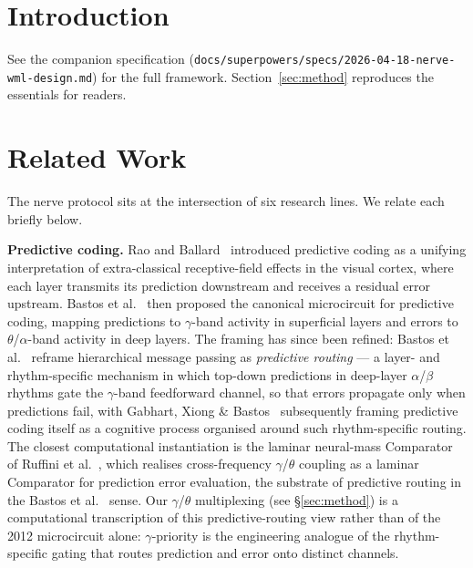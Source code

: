 \documentclass[10pt,twocolumn]{article}
\begin{document}
\section{Introduction}
See the companion specification (\texttt{docs/superpowers/specs/2026-04-18-nerve-wml-design.md})
for the full framework. Section~\ref{sec:method} reproduces the
essentials for readers.

\section{Related Work}

The nerve protocol sits at the intersection of six research lines. We relate each briefly below.

\textbf{Predictive coding.} Rao and Ballard~\cite{rao1999predictive} introduced predictive coding as a unifying interpretation of extra-classical receptive-field effects in the visual cortex, where each layer transmits its prediction downstream and receives a residual error upstream. Bastos et al.~\cite{bastos2012canonical} then proposed the canonical microcircuit for predictive coding, mapping predictions to $\gamma$-band activity in superficial layers and errors to $\theta$/$\alpha$-band activity in deep layers. The framing has since been refined: Bastos et
al.~\cite{bastos2020routing} reframe hierarchical message passing as
\emph{predictive routing} --- a layer- and rhythm-specific mechanism in
which top-down predictions in deep-layer $\alpha$/$\beta$ rhythms gate
the $\gamma$-band feedforward channel, so that errors propagate only
when predictions fail, with Gabhart, Xiong \& Bastos~\cite{gabhart2025predictive} subsequently
framing predictive coding itself as a cognitive process organised around such rhythm-specific routing.
The closest computational instantiation
is the laminar neural-mass Comparator of Ruffini et
al.~\cite{ruffini2025comparator}, which realises cross-frequency
$\gamma$/$\theta$ coupling as a laminar Comparator for prediction error evaluation, the substrate of predictive routing in the Bastos et al.~\cite{bastos2020routing} sense.
Our $\gamma$/$\theta$ multiplexing (see \S\ref{sec:method}) is a
computational transcription of this predictive-routing view rather than
of the 2012 microcircuit alone: $\gamma$-priority is the engineering
analogue of the rhythm-specific gating that routes prediction and error
onto distinct channels.
\end{document}
